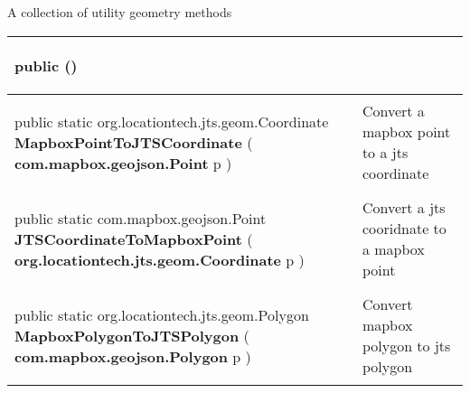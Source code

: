  {\scriptsize A collection of utility geometry methods
 
\vspace*{-5pt} 
\begin{tabularx}{\linewidth}{m{}|m{}}
\label{tab:GeometryUtilities}
\begin{raggedleft}public  \textbf{\hyperref[tab:GeometryUtilities]{\color{blue}{GeometryUtilities}}}()
\end{raggedleft} &
 \\ \hline 
\begin{raggedleft}public static org.locationtech.jts.geom.Coordinate \textbf{MapboxPointToJTSCoordinate }(\hspace*{ 5pt} \textbf{com.mapbox.geojson.Point} p  )
\end{raggedleft} &
 Convert a mapbox point to a jts coordinate\\ \hline 
\begin{raggedleft}public static com.mapbox.geojson.Point \textbf{JTSCoordinateToMapboxPoint }(\hspace*{ 5pt} \textbf{org.locationtech.jts.geom.Coordinate} p  )
\end{raggedleft} &
 Convert a jts cooridnate to a mapbox point\\ \hline 
\begin{raggedleft}public static org.locationtech.jts.geom.Polygon \textbf{MapboxPolygonToJTSPolygon }(\hspace*{ 5pt} \textbf{com.mapbox.geojson.Polygon} p  )
\end{raggedleft} &
 Convert mapbox polygon to jts polygon\\\end{tabularx}
}
